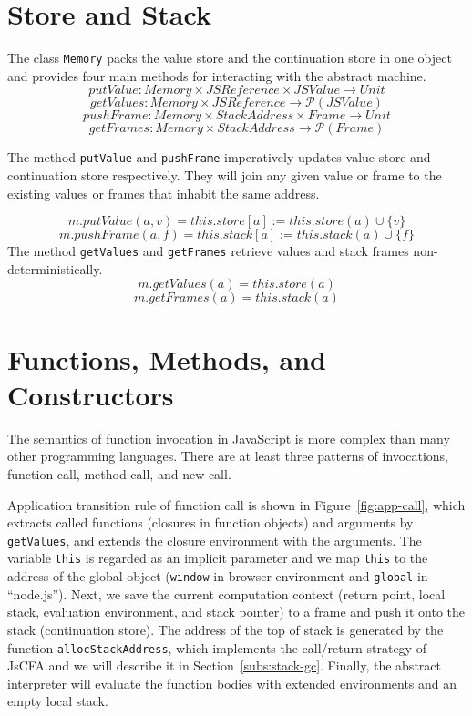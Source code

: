 \documentclass[12pt]{report}
\begin{document}
\section{Store and Stack}
\label{sub:Store and Stack}

The class \verb|Memory| packs the value store and the continuation store in one object and provides four main methods for interacting with the abstract machine.
\[
putValue: Memory \times JSReference \times JSValue \to Unit
\]
\[
getValues: Memory \times JSReference \to \mathcal{P}(JSValue)
\]
\[
pushFrame: Memory \times StackAddress \times Frame \to Unit
\]
\[
getFrames: Memory \times StackAddress \to \mathcal{P}(Frame)
\]

The method \verb|putValue| and \verb|pushFrame| imperatively updates value store and continuation store respectively.
They will join any given value or frame to the existing values or frames that inhabit the same address.

\[
m.putValue(a, v) = this.store[a] := this.store(a) \cup \{v\}
\]
\[
m.pushFrame(a, f) = this.stack[a] := this.stack(a) \cup \{f\}
\]
The method \verb|getValues| and \verb|getFrames| retrieve values and stack frames non-deterministically.
\[
m.getValues(a) = this.store(a)
\]
\[
m.getFrames(a) = this.stack(a)
\]

\section{Functions, Methods, and Constructors}
\label{sub:Functions, Methods, and Constructors}

The semantics of function invocation in JavaScript is more complex than many other programming languages.
There are at least three patterns of invocations, function call, method call, and new call.

Application transition rule of function call is shown in Figure~\ref{fig:app-call}, which extracts called functions (closures in function objects) and arguments by \verb|getValues|, and extends the closure environment with the arguments. The variable \verb|this| is regarded as an implicit parameter and we map \verb|this| to the address of the global object (\verb|window| in browser environment and \verb|global| in ``node.js''). Next, we save the current computation context (return point, local stack, evaluation environment, and stack pointer) to a frame and push it onto the stack (continuation store).
The address of the top of stack is generated by the function \verb|allocStackAddress|, which implements the call/return strategy of JsCFA and we will describe it in Section~\ref{subs:stack-gc}. Finally, the abstract interpreter will evaluate the function bodies with extended environments and an empty local stack.
\end{document}
